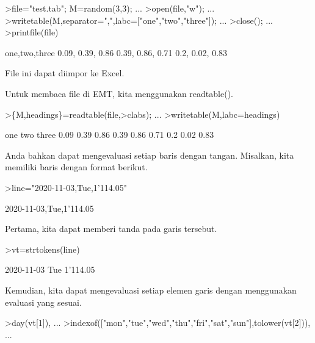 \documentclass[a4paper,10pt]{article}
\begin{document}
\begin{eulernotebook}
\begin{eulercomment}
\begin{eulercomment}
\begin{eulercomment}
\begin{eulercomment}
\begin{eulercomment}
\begin{eulercomment}
\begin{eulercomment}
\end{eulercomment}
\begin{eulerprompt}
>file="test.tab"; M=random(3,3);  ...
>open(file,"w");  ...
>writetable(M,separator=",",labc=["one","two","three"]);  ...
>close(); ...
>printfile(file)
\end{eulerprompt}
\begin{euleroutput}
  one,two,three
        0.09,      0.39,      0.86
        0.39,      0.86,      0.71
         0.2,      0.02,      0.83
\end{euleroutput}
\begin{eulercomment}
File ini dapat diimpor ke Excel.

Untuk membaca file di EMT, kita menggunakan readtable().
\end{eulercomment}
\begin{eulerprompt}
>\{M,headings\}=readtable(file,>clabs); ...
>writetable(M,labc=headings)
\end{eulerprompt}
\begin{euleroutput}
         one       two     three
        0.09      0.39      0.86
        0.39      0.86      0.71
         0.2      0.02      0.83
\end{euleroutput}
\begin{eulercomment}
Anda bahkan dapat mengevaluasi setiap baris dengan tangan. Misalkan,
kita memiliki baris dengan format berikut.
\end{eulercomment}
\begin{eulerprompt}
>line="2020-11-03,Tue,1'114.05"
\end{eulerprompt}
\begin{euleroutput}
  2020-11-03,Tue,1'114.05
\end{euleroutput}
\begin{eulercomment}
Pertama, kita dapat memberi tanda pada garis tersebut.
\end{eulercomment}
\begin{eulerprompt}
>vt=strtokens(line)
\end{eulerprompt}
\begin{euleroutput}
  2020-11-03
  Tue
  1'114.05
\end{euleroutput}
\begin{eulercomment}
Kemudian, kita dapat mengevaluasi setiap elemen garis dengan
menggunakan evaluasi yang sesuai.
\end{eulercomment}
\begin{eulerprompt}
>day(vt[1]),  ...
>indexof(["mon","tue","wed","thu","fri","sat","sun"],tolower(vt[2])),  ...

\end{eulerprompt}
\end{eulercomment}
\end{eulercomment}
\end{eulercomment}
\end{eulercomment}
\end{eulercomment}
\end{eulercomment}
\end{eulernotebook}
\end{document}
